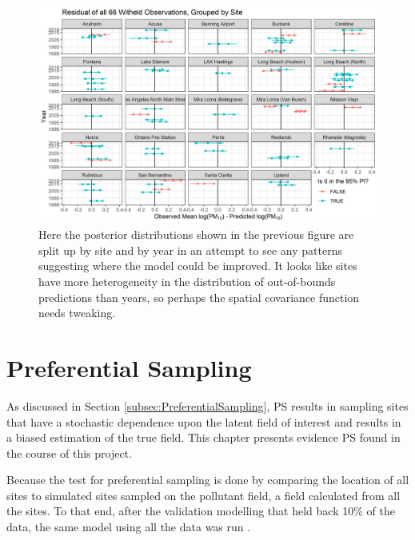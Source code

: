 \documentclass{article}
\begin{document}
\begin{figure}[ht]
    \centering
    \includegraphics[width = \textwidth]{Figures/Validation/validate_delta_site.png}
    \caption{Here the posterior distributions shown in the previous figure are split up by site and by year in an attempt to see any patterns suggesting where the model could be improved.  It looks like sites have more heterogeneity in the distribution of out-of-bounds predictions than years, so perhaps the spatial covariance function needs tweaking.}
    \label{fig:validate_delta_site}
\end{figure}


%
\section{Preferential Sampling}
\label{sec:prefsamp}

As discussed in Section \ref{subsec:PreferentialSampling}, \ac{PS} results in sampling sites that have a stochastic dependence upon the latent field of interest and results in a biased estimation of the true field.  This chapter presents evidence  \ac{PS} found in the course of this project.

Because the test for preferential sampling is done by comparing the location of all sites to simulated sites sampled on the pollutant field, a field calculated from all the sites.  To that end, after the validation modelling that held back 10\% of the data, the same model using all the data was run .
\end{document}
